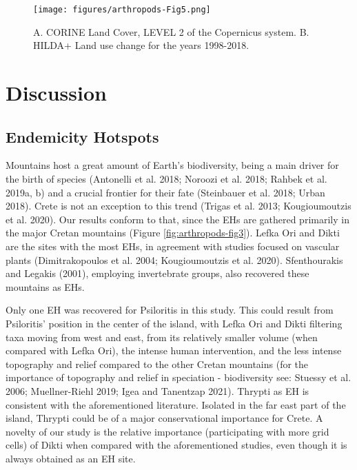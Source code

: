   \begin{figure}[h]
      \centering
      \texttt{[image: figures/arthropods-Fig5.png]}
      \caption[Land Use of Crete and the changes]{A. CORINE Land Cover, LEVEL 2 of the Copernicus system. B. HILDA+ Land use change for the years 1998-2018.}
      \label{fig:arthropods-fig5}
   \end{figure}


\section{Discussion}
\label{sec:arthropods-discussion}

    \subsection{Endemicity Hotspots}
    \label{subsec:arthropods-Endemicity-Hotspots}

Mountains host a great amount of Earth’s biodiversity, being a main driver for
the birth of species (Antonelli et al. 2018; Noroozi et al. 2018; Rahbek et al. 2019a, b)
and a crucial frontier for their fate (Steinbauer et al. 2018; Urban 2018).
Crete is not an exception to this trend (Trigas et al. 2013; Kougioumoutzis et al. 2020).
Our results conform to that, since the EHs are gathered primarily in the major
Cretan mountains (Figure \ref{fig:arthropods-fig3}). Lefka Ori and Dikti are the sites with the most
EHs, in agreement with studies focused on vascular plants (Dimitrakopoulos et al. 2004; Kougioumoutzis et al. 2020).
Sfenthourakis and Legakis (2001), employing invertebrate groups, also recovered these mountains as EHs.

Only one EH was recovered for Psiloritis in this study. This could result from
Psiloritis’ position in the center of the island, with Lefka Ori and Dikti
filtering taxa moving from west and east, from its relatively smaller volume
(when compared with Lefka Ori), the intense human intervention, and the less
intense topography and relief compared to the other Cretan mountains (for the
importance of topography and relief in speciation - biodiversity see: Stuessy et al. 2006; Muellner-Riehl 2019; Igea and Tanentzap 2021).
Thrypti as EH is consistent with the aforementioned literature. Isolated in the
far east part of the island, Thrypti could be of a major conservational importance for Crete.
A novelty of our study is the relative importance (participating with more grid cells)
of Dikti when compared with the aforementioned studies, even though it is always obtained as an EH site. 

